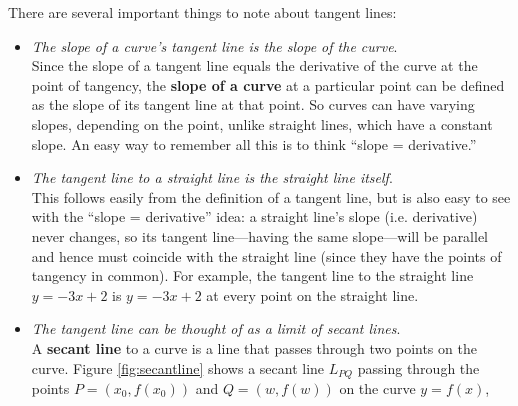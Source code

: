 \divider
\newpage
There are several important things to note about tangent lines:
\begin{itemize}
 \item \emph{The slope of a curve's tangent line is the slope of the curve}.\\
  Since the slope of a tangent line equals the derivative of the curve at the
  point of tangency, the \textbf{slope of a curve} at a particular point can be
  defined as the slope of its tangent line at that point.
  So curves can have varying slopes, depending on the point, unlike straight
  lines, which have a constant slope. An easy way to remember all this is to
  think ``slope = derivative.''
 \item \emph{The tangent line to a straight line is the straight line itself}.\\
  This follows easily from the definition of a tangent line, but is also easy
  to see with the ``slope = derivative'' idea: a straight line's slope (i.e.
  derivative) never changes, so its tangent line---having the same slope---will
  be parallel and hence must coincide with the straight line (since they have
  the points of tangency in common). For example, the tangent line to the
  straight line $y = -3x + 2$ is $y = -3x + 2$ at every point on the straight
  line.
 \item \emph{The tangent line can be thought of as a limit of secant lines}.\\
 A \textbf{secant line} to a curve is a line that passes
through two points on the curve. Figure \ref{fig:secantline} shows a secant line
$L_{PQ}$ passing through the points $P = (x_0,f(x_0)) $ and $Q = (w,f(w))$ on the
curve $y = f(x)$,


\end{itemize}
